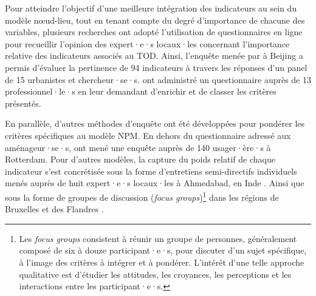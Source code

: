 \begin{refsegment}
Pour atteindre l'objectif d'une meilleure intégration des indicateurs au sein du modèle nœud-lieu, tout en tenant compte du degré d'importance de chacune des variables, plusieurs recherches ont adopté l'utilisation de questionnaires en ligne pour recueillir l'opinion des expert·e·s locaux·les concernant l'importance relative des indicateurs associés au \acrshort{TOD}. Ainsi, l'enquête menée par \textcolor{blue}{\textcite[42]{lyu_developing_2016}} à Beijing a permis d'évaluer la pertinence de 94 indicateurs à travers les réponses d'un panel de 15 urbanistes et chercheur·se·s. \textcolor{blue}{\textcite[196]{reusser_classifying_2008}} ont administré un questionnaire auprès de 13 professionnel·le·s en leur demandant d’enrichir et de classer les critères présentés.%

En parallèle, d'autres méthodes d'enquête ont été développées pour pondérer les critères spécifiques au modèle \acrshort{NPM}. En dehors du questionnaire adressé aux aménageur·se·s, \textcolor{blue}{\textcite[8]{groenendijk_incorporating_2018}} ont mené une enquête auprès de 140 usager·ère·s à Rotterdam. Pour d'autres modèles, la capture du poids relatif de chaque indicateur s'est concrétisée sous la forme d'entretiens semi-directifs individuels menés auprès de huit expert·e·s locaux·les à Ahmedabad, en Inde \textcolor{blue}{\autocite[1~018]{maheshwari_evaluating_2022}}. Ainsi que sous la forme de groupes de discussion (\textsl{focus groups})\footnote{
    Les \textsl{focus groups} consistent à réunir un groupe de personnes, généralement composé de six à douze participant·e·s, pour discuter d'un sujet spécifique, à l'image des critères à intégrer et à pondérer. L'intérêt d'une telle approche qualitative est d'étudier les attitudes, les croyances, les perceptions et les interactions entre les participant·e·s.
} dans les régions de Bruxelles et des Flandres \textcolor{blue}{\autocite[95]{caset_planning_2019}}.%


\end{refsegment}
